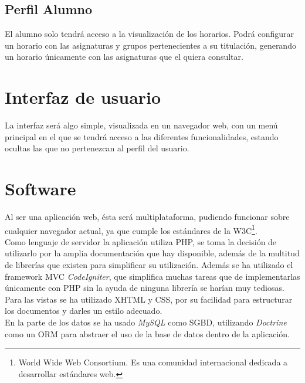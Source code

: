 \subsection{Perfil Alumno}
El alumno solo tendrá acceso a la visualización de los horarios. Podrá configurar un horario con las asignaturas y grupos pertenecientes a su titulación, generando un horario únicamente con las asignaturas que el quiera consultar.

\section{Interfaz de usuario}
La interfaz será algo simple, visualizada en un navegador web, con un menú principal en el que se tendrá acceso a las diferentes funcionalidades, estando ocultas las que no pertenezcan al perfil del usuario.

\section{Software}
Al ser una aplicación web, ésta será multiplataforma, pudiendo funcionar sobre cualquier navegador actual, ya que cumple los estándares de la W3C\footnote{World Wide Web Consortium. Es una comunidad internacional dedicada a desarrollar estándares web.}.\\

Como lenguaje de servidor la aplicación utiliza PHP, se toma la decisión de utilizarlo por la amplia documentación que hay disponible, además de la multitud de librerías que existen para simplificar su utilización. Además se ha utilizado el framework MVC {\em CodeIgniter}, que simplifica muchas tareas que de implementarlas únicamente con PHP sin la ayuda de ninguna librería se harían muy tediosas.\\

Para las vistas se ha utilizado XHTML y CSS, por su facilidad para estructurar los documentos y darles un estilo adecuado.\\

En la parte de los datos se ha usado {\em MySQL} como SGBD, utilizando {\em Doctrine} como un ORM para abstraer el uso de la base de datos dentro de la aplicación.
